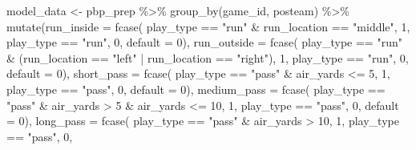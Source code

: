 \documentclass[
  letterpaper,
]{krantz}
\newenvironment{Shaded}{\begin{snugshade}}{\end{snugshade}}
\newcommand{\AttributeTok}[1]{\textcolor[rgb]{0.40,0.45,0.13}{#1}}
\newcommand{\DecValTok}[1]{\textcolor[rgb]{0.68,0.00,0.00}{#1}}
\newcommand{\FunctionTok}[1]{\textcolor[rgb]{0.28,0.35,0.67}{#1}}
\newcommand{\NormalTok}[1]{\textcolor[rgb]{0.00,0.23,0.31}{#1}}
\newcommand{\OtherTok}[1]{\textcolor[rgb]{0.00,0.23,0.31}{#1}}
\newcommand{\SpecialCharTok}[1]{\textcolor[rgb]{0.37,0.37,0.37}{#1}}
\newcommand{\StringTok}[1]{\textcolor[rgb]{0.13,0.47,0.30}{#1}}
\begin{document}
\begin{Shaded}
\begin{Highlighting}[]
\NormalTok{model\_data }\OtherTok{\textless{}{-}}\NormalTok{ pbp\_prep }\SpecialCharTok{\%\textgreater{}\%}
  \FunctionTok{group\_by}\NormalTok{(game\_id, posteam) }\SpecialCharTok{\%\textgreater{}\%}
  \FunctionTok{mutate}\NormalTok{(}\AttributeTok{run\_inside =} \FunctionTok{fcase}\NormalTok{(}
\NormalTok{    play\_type }\SpecialCharTok{==} \StringTok{"run"} \SpecialCharTok{\&}\NormalTok{ run\_location }\SpecialCharTok{==} \StringTok{"middle"}\NormalTok{, }\DecValTok{1}\NormalTok{,}
\NormalTok{    play\_type }\SpecialCharTok{==} \StringTok{"run"}\NormalTok{, }\DecValTok{0}\NormalTok{,}
    \AttributeTok{default =} \DecValTok{0}\NormalTok{),}
    \AttributeTok{run\_outside =} \FunctionTok{fcase}\NormalTok{(}
\NormalTok{      play\_type }\SpecialCharTok{==} \StringTok{"run"} \SpecialCharTok{\&}\NormalTok{ (run\_location }\SpecialCharTok{==} \StringTok{"left"} \SpecialCharTok{|}
\NormalTok{                              run\_location }\SpecialCharTok{==} \StringTok{"right"}\NormalTok{), }\DecValTok{1}\NormalTok{,}
\NormalTok{      play\_type }\SpecialCharTok{==} \StringTok{"run"}\NormalTok{, }\DecValTok{0}\NormalTok{,}
      \AttributeTok{default =} \DecValTok{0}\NormalTok{),}
    \AttributeTok{short\_pass =} \FunctionTok{fcase}\NormalTok{(}
\NormalTok{      play\_type }\SpecialCharTok{==} \StringTok{"pass"} \SpecialCharTok{\&}\NormalTok{ air\_yards }\SpecialCharTok{\textless{}=} \DecValTok{5}\NormalTok{, }\DecValTok{1}\NormalTok{,}
\NormalTok{      play\_type }\SpecialCharTok{==} \StringTok{"pass"}\NormalTok{, }\DecValTok{0}\NormalTok{,}
      \AttributeTok{default =} \DecValTok{0}\NormalTok{),}
    \AttributeTok{medium\_pass =} \FunctionTok{fcase}\NormalTok{(}
\NormalTok{      play\_type }\SpecialCharTok{==} \StringTok{"pass"} \SpecialCharTok{\&}\NormalTok{ air\_yards }\SpecialCharTok{\textgreater{}} \DecValTok{5} \SpecialCharTok{\&}
\NormalTok{        air\_yards }\SpecialCharTok{\textless{}=} \DecValTok{10}\NormalTok{, }\DecValTok{1}\NormalTok{,}
\NormalTok{      play\_type }\SpecialCharTok{==} \StringTok{"pass"}\NormalTok{, }\DecValTok{0}\NormalTok{,}
      \AttributeTok{default =} \DecValTok{0}\NormalTok{),}
    \AttributeTok{long\_pass =} \FunctionTok{fcase}\NormalTok{(}
\NormalTok{      play\_type }\SpecialCharTok{==} \StringTok{"pass"} \SpecialCharTok{\&}\NormalTok{ air\_yards }\SpecialCharTok{\textgreater{}} \DecValTok{10}\NormalTok{, }\DecValTok{1}\NormalTok{,}
\NormalTok{      play\_type }\SpecialCharTok{==} \StringTok{"pass"}\NormalTok{, }\DecValTok{0}\NormalTok{,}

\end{Highlighting}
\end{Shaded}
\end{document}
